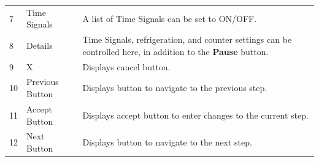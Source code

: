 \begin{longtable}[]{@{}lll@{}}
\begin{minipage}[t]{0.04\columnwidth}
7\strut
\end{minipage} & \begin{minipage}[t]{0.23\columnwidth}\raggedright
Time Signals\strut
\end{minipage} & \begin{minipage}[t]{0.65\columnwidth}\raggedright
A list of Time Signals can be set to ON/OFF.\strut
\end{minipage}\tabularnewline
\begin{minipage}[t]{0.04\columnwidth}\raggedright
8\strut
\end{minipage} & \begin{minipage}[t]{0.23\columnwidth}\raggedright
Details\strut
\end{minipage} & \begin{minipage}[t]{0.65\columnwidth}\raggedright
Time Signals, refrigeration, and counter settings can be controlled
here, in addition to the \textbf{Pause} button.\strut
\end{minipage}\tabularnewline
\begin{minipage}[t]{0.04\columnwidth}\raggedright
9\strut
\end{minipage} & \begin{minipage}[t]{0.23\columnwidth}\raggedright
X\strut
\end{minipage} & \begin{minipage}[t]{0.65\columnwidth}\raggedright
Displays cancel button.\strut
\end{minipage}\tabularnewline
\begin{minipage}[t]{0.04\columnwidth}\raggedright
10\strut
\end{minipage} & \begin{minipage}[t]{0.23\columnwidth}\raggedright
Previous Button\strut
\end{minipage} & \begin{minipage}[t]{0.65\columnwidth}\raggedright
Displays button to navigate to the previous step.\strut
\end{minipage}\tabularnewline
\begin{minipage}[t]{0.04\columnwidth}\raggedright
11\strut
\end{minipage} & \begin{minipage}[t]{0.23\columnwidth}\raggedright
Accept Button\strut
\end{minipage} & \begin{minipage}[t]{0.65\columnwidth}\raggedright
Displays accept button to enter changes to the current step.\strut
\end{minipage}\tabularnewline
\begin{minipage}[t]{0.04\columnwidth}\raggedright
12\strut
\end{minipage} & \begin{minipage}[t]{0.23\columnwidth}\raggedright
Next Button\strut
\end{minipage} & \begin{minipage}[t]{0.65\columnwidth}\raggedright
Displays button to navigate to the next step.\strut
\end{minipage}\tabularnewline
\bottomrule
\end{longtable}

